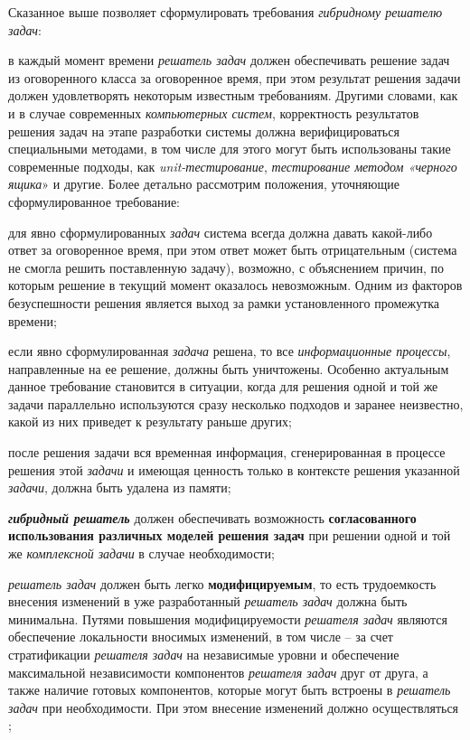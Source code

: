 Сказанное выше позволяет сформулировать требования \textit{гибридному решателю задач}:
\begin{textitemize}
	\item в каждый момент времени \textit{решатель задач} должен обеспечивать решение задач из оговоренного класса за оговоренное время, при этом результат решения задачи должен удовлетворять некоторым известным требованиям. Другими словами, как и в случае современных \textit{компьютерных систем}, корректность результатов решения задач на этапе разработки системы должна верифицироваться специальными методами, в том числе для этого могут быть использованы такие современные подходы, как \textit{unit-тестирование}, \textit{тестирование методом «черного ящика}» и другие. Более детально рассмотрим положения, уточняющие сформулированное требование:
	\begin{textitemize}
		\item для явно сформулированных \textit{задач} система всегда должна давать какой-либо ответ за оговоренное время, при этом ответ может быть отрицательным (система не смогла решить поставленную задачу), возможно, с объяснением причин, по которым решение в текущий момент оказалось невозможным. Одним из факторов безуспешности решения является выход за рамки установленного промежутка времени;
		\item если явно сформулированная \textit{задача} решена, то все \textit{информационные процессы}, направленные на ее решение, должны быть уничтожены. Особенно актуальным данное требование становится в ситуации, когда для решения одной и той же задачи параллельно используются сразу несколько подходов и заранее неизвестно, какой из них приведет к результату раньше других;
		\item после решения задачи вся временная информация, сгенерированная в процессе решения этой \textit{задачи} и имеющая ценность только в контексте решения указанной \textit{задачи}, должна быть удалена из памяти;
	\end{textitemize}
	
	\item \textit{\textbf{гибридный решатель}} должен обеспечивать возможность \textbf{согласованного использования различных моделей решения задач} при решении одной и той же \textit{комплексной задачи} в случае необходимости;
	
	\item \textit{решатель задач} должен быть легко \textbf{модифицируемым}, то есть трудоемкость внесения изменений в уже разработанный \textit{решатель задач} должна быть минимальна. Путями повышения модифицируемости \textit{решателя задач} являются обеспечение локальности вносимых изменений, в том числе -- за счет стратификации \textit{решателя задач} на независимые уровни и обеспечение максимальной независимости компонентов \textit{решателя задач} друг от друга, а также наличие готовых компонентов, которые могут быть встроены в \textit{решатель задач} при необходимости. При этом внесение изменений должно осуществляться ;
	

\end{textitemize}
